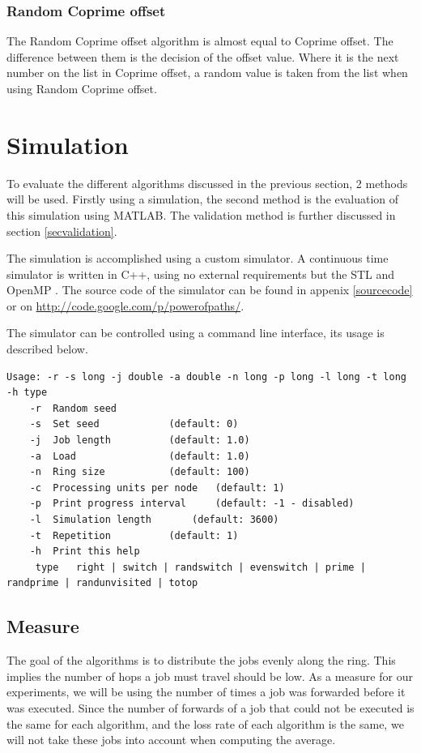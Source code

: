 \documentclass[10pt,a4paper]{article}
\begin{document}
\subsubsection{Random Coprime offset}
The Random Coprime offset algorithm is almost equal to Coprime offset. The difference between them is the decision of the offset value. Where it is the next number on the list in Coprime offset, a random value is taken from the list when using Random Coprime offset.

\section{Simulation}
\label{secsimulation}
To evaluate the different algorithms discussed in the previous section, 2 methods will be used. Firstly using a simulation, the second method is the evaluation of this simulation using MATLAB. The validation method is further discussed in section \ref{secvalidation}.

The simulation is accomplished using a custom simulator. A continuous time simulator is written in C++, using no external requirements but the STL and OpenMP \cite{OPENMP}. The source code of the simulator can be found in appenix \ref{sourcecode} or on \url{http://code.google.com/p/powerofpaths/}.

The simulator can be controlled using a command line interface, its usage is described below.

\begin{lstlisting}
Usage: -r -s long -j double -a double -n long -p long -l long -t long -h type
	-r	Random seed
	-s	Set seed			(default: 0)
	-j	Job length			(default: 1.0)
	-a	Load				(default: 1.0)
	-n	Ring size			(default: 100)
	-c	Processing units per node	(default: 1)
	-p	Print progress interval		(default: -1 - disabled)
	-l	Simulation length		(default: 3600)
	-t	Repetition			(default: 1)
	-h	Print this help
	 type	right | switch | randswitch | evenswitch | prime | randprime | randunvisited | totop
\end{lstlisting}

\subsection{Measure}
The goal of the algorithms is to distribute the jobs evenly along the ring. This implies the number of hops a job must travel should be low. As a measure for our experiments, we will be using the number of times a job was forwarded before it was executed. Since the number of forwards of a job that could not be executed is the same for each algorithm, and the loss rate of each algorithm is the same, we will not take these jobs into account when computing the average.
\end{document}
